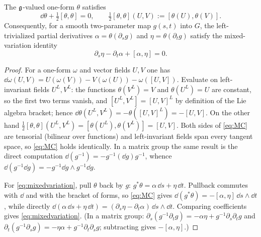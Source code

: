 \begin{proposition}\label{prop:MC}
The $\mathfrak{g}$-valued one-form $\theta$ satisfies
\begin{equation}\label{eq:MC}
 \dd\theta+\tfrac12[\theta,\theta]=0,\qquad
 \tfrac12[\theta,\theta](U,V):=[\theta(U),\theta(V)].
\end{equation}
Consequently, for a smooth two-parameter map $g(s,t)$ into $G$, the
left-trivialized partial derivatives
$\alpha=\theta(\partial_sg)$ and $\eta=\theta(\partial_tg)$ satisfy the
mixed-variation identity
\begin{equation}\label{eq:mixedvariation}
 \partial_s\eta-\partial_t\alpha+[\alpha,\eta]=0.
\end{equation}
\end{proposition}
\begin{proof}
For a one-form $\omega$ and vector fields $U,V$ one has
$\dd\omega(U,V)=U(\omega(V))-V(\omega(U))-\omega([U,V])$. Evaluate on
left-invariant fields $U^L,V^L$: the functions $\theta(V^L)=V$ and
$\theta(U^L)=U$ are constant, so the first two terms vanish, and
$[U^L,V^L]=[U,V]^L$ by definition of the Lie algebra bracket; hence
$\dd\theta(U^L,V^L)=-\theta([U,V]^L)=-[U,V]$. On the other hand
$\frac12[\theta,\theta](U^L,V^L)=[\theta(U^L),\theta(V^L)]=[U,V]$. Both
sides of \eqref{eq:MC} are tensorial (bilinear over functions) and
left-invariant fields span every tangent space, so \eqref{eq:MC} holds
identically. In a matrix group the same result is the direct computation
$\dd(g^{-1})=-g^{-1}(\dd g)g^{-1}$, whence
$\dd(g^{-1}\dd g)=-g^{-1}\dd g\wedge g^{-1}\dd g$.

For \eqref{eq:mixedvariation}, pull $\theta$ back by $g$:
$g^*\theta=\alpha\,\dd s+\eta\,\dd t$. Pullback commutes with $\dd$ and
with the bracket of forms, so \eqref{eq:MC} gives
$\dd(g^*\theta)=-[\alpha,\eta]\,\dd s\wedge\dd t$, while directly
$\dd(\alpha\,\dd s+\eta\,\dd t)=(\partial_s\eta-\partial_t\alpha)\,\dd s\wedge\dd t$.
Comparing coefficients gives \eqref{eq:mixedvariation}. (In a matrix group:
$\partial_s(g^{-1}\partial_tg)=-\alpha\eta+g^{-1}\partial_s\partial_tg$ and
$\partial_t(g^{-1}\partial_sg)=-\eta\alpha+g^{-1}\partial_t\partial_sg$;
subtracting gives $-[\alpha,\eta]$.)
\end{proof}

